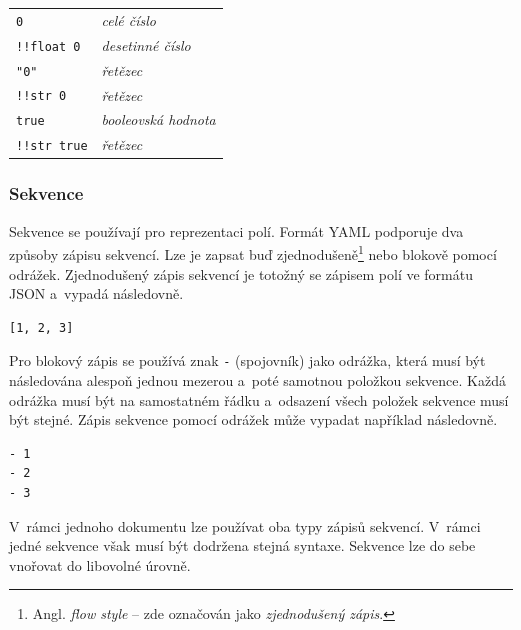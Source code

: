 \documentclass[FM,bw,DP]{tulthesis}
\begin{document}
\vspace{-2pt}
\setlength\LTleft\parindent
\begin{longtable}{m{5cm}@{}l}
\texttt{0}\dotfill & \textit{celé číslo} \\
\texttt{!!float 0}\dotfill & \textit{desetinné číslo} \\
\texttt{"0"}\dotfill & \textit{řetězec} \\
\texttt{!!str 0}\dotfill & \textit{řetězec} \\
\texttt{true}\dotfill & \textit{booleovská hodnota} \\
\texttt{!!str true}\dotfill & \textit{řetězec} \\
\end{longtable}
\vspace{-15pt}

\subsubsection*{Sekvence}

Sekvence se používají pro reprezentaci polí. Formát \gls{YAML} podporuje dva způsoby zápisu sekvencí. Lze je zapsat buď zjednodušeně\footnote{Angl. \textit{flow style} -- zde označován jako \textit{zjednodušený zápis}.} nebo blokově pomocí odrážek. Zjednodušený zápis sekvencí je totožný se zápisem polí ve formátu \gls{JSON} a~vypadá následovně.

\lstset{style=short}

\vspace{5pt}
\begin{lstlisting}
[1, 2, 3]
\end{lstlisting}
\vspace*{-20pt}

Pro blokový zápis se používá znak \texttt{-} (spojovník) jako odrážka, která musí být následována alespoň jednou mezerou a~poté samotnou položkou sekvence. Každá odrážka musí být na samostatném řádku a~odsazení všech položek sekvence musí být stejné. Zápis sekvence pomocí odrážek může vypadat například následovně.

\vspace{5pt}
\begin{lstlisting}
- 1
- 2
- 3
\end{lstlisting}
\vspace*{-20pt}

V~rámci jednoho dokumentu lze používat oba typy zápisů sekvencí. V~rámci jedné sekvence však musí být dodržena stejná syntaxe. Sekvence lze do sebe vnořovat do libovolné úrovně.
\end{document}

